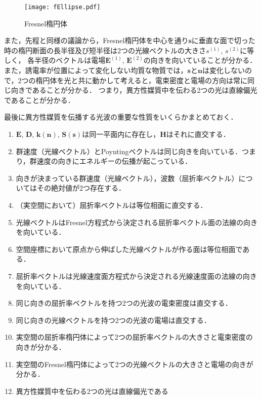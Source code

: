 \begin{figure}[ht]
  \centering
  \texttt{[image: fEllipse.pdf]}
  \caption{Fresnel楕円体}
  \label{fEllipse}
\end{figure}

また，先程と同様の議論から，Fresnel楕円体を中心を通り$\boldsymbol{s}$に垂直な面で切った時の楕円断面の長半径及び短半径は2つの光線ベクトルの大きさ$s^{(1)}$, $s^{(2)}$に等しく，
各半径のベクトルは電場$\boldsymbol{E}^{(1)}$, $\boldsymbol{E}^{(2)}$の向きを向いていることが分かる．
また，誘電率が位置によって変化しない均質な物質では，$\boldsymbol{s}$と$\boldsymbol{n}$は変化しないので，2つの楕円体を光と共に動かして考えると，電束密度と電場の方向は常に同じ向きであることが分かる．
つまり，異方性媒質中を伝わる2つの光は直線偏光であることが分かる．

最後に異方性媒質を伝播する光波の重要な性質をいくらかまとめておく．
\begin{enumerate}
  \item $\boldsymbol{E}$, $\boldsymbol{D}$, $\boldsymbol{k}(\boldsymbol{n})$, $\boldsymbol{S}(\boldsymbol{s})$は同一平面内に存在し，$\boldsymbol{H}$はそれに直交する．
  \item 群速度（光線ベクトル）とPoyntingベクトルは同じ向きを向いている．つまり，群速度の向きにエネルギーの伝播が起こっている．
  \item 向きが決まっている群速度（光線ベクトル），波数（屈折率ベクトル）についてはその絶対値が2つ存在する．
  \item （実空間において）屈折率ベクトルは等位相面に直交する．
  \item 光線ベクトルはFresnel方程式から決定される屈折率ベクトル面の法線の向きを向いている．
  \item 空間座標において原点から伸ばした光線ベクトルが作る面は等位相面である．
  \item 屈折率ベクトルは光線速度面方程式から決定される光線速度面の法線の向きを向いている．
  \item 同じ向きの屈折率ベクトルを持つ2つの光波の電束密度は直交する．
  \item 同じ向きの光線ベクトルを持つ2つの光波の電場は直交する．
  \item 実空間の屈折率楕円体によって2つの屈折率ベクトルの大きさと電束密度の向きが分かる．
  \item 実空間のFresnel楕円体によって2つの光線ベクトルの大きさと電場の向きが分かる．
  \item 異方性媒質中を伝わる2つの光は直線偏光である
\end{enumerate}
